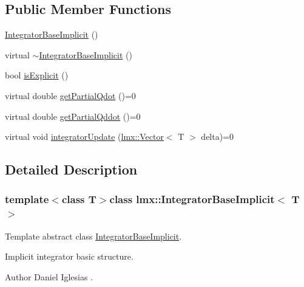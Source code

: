 \subsection*{Public Member Functions}
\begin{DoxyCompactItemize}
\item 
\hyperlink{classlmx_1_1IntegratorBaseImplicit_a9ebebca6cd29dce17da68385085870be}{Integrator\-Base\-Implicit} ()
\item 
virtual \hyperlink{classlmx_1_1IntegratorBaseImplicit_a6b8b7489aead3b0634db14bbae16333f}{$\sim$\-Integrator\-Base\-Implicit} ()
\item 
bool \hyperlink{classlmx_1_1IntegratorBaseImplicit_a142802380bd75f1118a8815b2d2f0c75}{is\-Explicit} ()
\item 
virtual double \hyperlink{classlmx_1_1IntegratorBaseImplicit_a8ee5ecd8b0bae40d8d79f48ca69f350f}{get\-Partial\-Qdot} ()=0
\item 
virtual double \hyperlink{classlmx_1_1IntegratorBaseImplicit_a8933718fdb3629e07d0972d846c92a8e}{get\-Partial\-Qddot} ()=0
\item 
virtual void \hyperlink{classlmx_1_1IntegratorBaseImplicit_aa7d97f0c3d139326a6b7ca28605f9681}{integrator\-Update} (\hyperlink{classlmx_1_1Vector}{lmx\-::\-Vector}$<$ T $>$ delta)=0
\end{DoxyCompactItemize}


\subsection{Detailed Description}
\subsubsection*{template$<$class T$>$class lmx\-::\-Integrator\-Base\-Implicit$<$ T $>$}

Template abstract class \hyperlink{classlmx_1_1IntegratorBaseImplicit}{Integrator\-Base\-Implicit}. 

Implicit integrator basic structure.

\begin{DoxyAuthor}{Author}
Daniel Iglesias . 
\end{DoxyAuthor}


